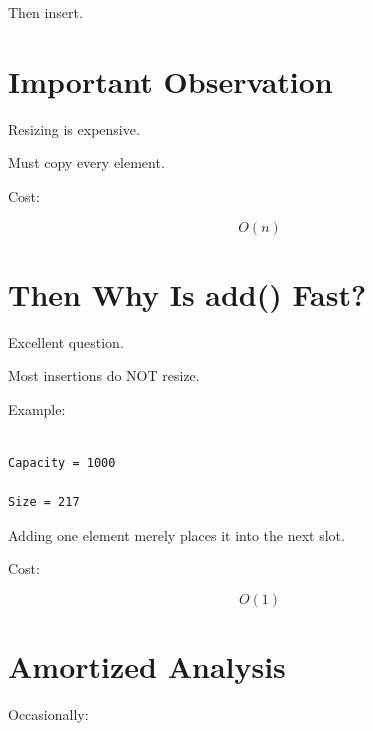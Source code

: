 \documentclass[11pt,a4paper]{book}
\begin{document}
Then insert.


\section{Important Observation}

Resizing is expensive.


Must copy every element.


Cost:

\[
O(n)
\]


\section{Then Why Is add() Fast?}

Excellent question.


Most insertions do NOT resize.


Example:

\begin{verbatim}

Capacity = 1000

Size = 217

\end{verbatim}


Adding one element merely places
it into the next slot.


Cost:

\[
O(1)
\]


\section{Amortized Analysis}

Occasionally:
\end{document}
